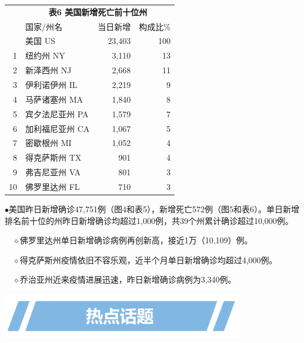 \documentclass[
]{article}
\begin{document}
\begin{table}[H]
\begin{table}[H]
\begin{tabular}{rlrr}
\toprule
\multicolumn{0}{c}{\textbf{ }} & \multicolumn{3}{c}{\textbf{表6 美国新增死亡前十位州}} \\
  & 国家/州名 & 当日新增 & 构成比\%\\
\midrule
\rowcolor{gray!6}   & 美国 US & 23,403 & 100\\
1 & 纽约州 NY & 3,110 & 13\\
\rowcolor{gray!6}  2 & 新泽西州 NJ & 2,668 & 11\\
3 & 伊利诺伊州 IL & 2,219 & 9\\
\rowcolor{gray!6}  4 & 马萨诸塞州 MA & 1,840 & 8\\
5 & 宾夕法尼亚州 PA & 1,579 & 7\\
\rowcolor{gray!6}  6 & 加利福尼亚州 CA & 1,067 & 5\\
7 & 密歇根州 MI & 1,052 & 4\\
\rowcolor{gray!6}  8 & 得克萨斯州 TX & 901 & 4\\
9 & 弗吉尼亚州 VA & 801 & 3\\
\rowcolor{gray!6}  10 & 佛罗里达州 FL & 710 & 3\\
\bottomrule
\end{tabular}
\endgroup{}
\end{table} \begin{tablenotes}
        \fontsize{15}{15}
        \selectfont
        \item 
      \end{tablenotes}
\end{table}

\(\bullet\)美国昨日新增确诊47,751例（图4和表5），新增死亡572例（图5和表6）。单日新增排名前十位的州昨日新增确诊均超过1,000例，共39个州累计确诊超过10,000例。

\(\quad\)\(\diamond\)佛罗里达州单日新增确诊病例再创新高，接近1万（10,109）例。

\(\quad\)\(\diamond\)得克萨斯州疫情依旧不容乐观，近半个月单日新增确诊均超过4,000例。

\(\quad\)\(\diamond\)乔治亚州近来疫情进展迅速，昨日新增确诊病例为3,340例。

\vspace{5mm}

\begin{center}
\includegraphics[height=2cm]{./input/title3.png} 
\end{center}
\end{document}
